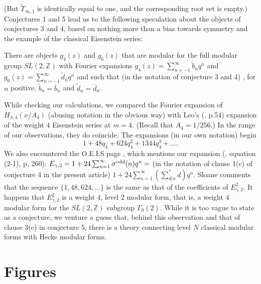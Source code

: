 \documentclass{article}
\begin{document}
\noindent
(But
$\widetilde{T}_{\infty,1}$ 
is identically equal to one,
and the corresponding root set
is empty.)
\newline \newline \noindent
Conjectures 1 and 5 lead us to
the following speculation about the
objects of conjectures 3 and 4,
based on nothing more than a bias
towards symmetry and the example
of the classical Eisenstein series:
\begin{conjecture}
There are objects $g_4(z)$ and $g_6(z)$ 
that are modular for
the full modular group $SL(2,\mathbb{Z})$
with Fourier expansions
$g_4(z) = \sum _{n=-1}^{\infty} \tilde{b}_n q^n$
and
$g_6(z) = \sum _{n=-1}^{\infty} \tilde{d}_n q^n$
and such that  (in the notation of
conjecture 3 and 4) , for $n$ positive,
$\tilde{b}_n = \overline{b}_n$ and
$\tilde{d}_n = \overline{d}_n$.
\end{conjecture}
\begin{remark}
While checking our calculations, we compared the 
Fourier expansion
of $H_{\lambda,4}(x/A_4)$ (abusing notation in the 
obvious way) with Leo's (\cite{leo2008fourier}, p.54)
expansion of the weight $4$ Eisenstein series at $m = 4$.
(Recall that $A_4 = 1/256.$)
In the range of our observations, they do coincide. 
%
%
The expansions (in our own notation) begin 
$$
1 + 48q_4 + 624 q_4^2 + 1344 q_4^3 + ....
$$
We also encountered the O.E.I.S  page
\cite{OEIS5},
which mentions our expansion
 (\cite{brent2001quadratic},
equation (2-1), p, 260):
$
E_{\gamma,2} = 1 + 24\sum_{n=1}^{\infty} \sigma^{\rm{odd}}(n) q^n =$
(in the notation of clause 1(c) of conjecture 4 in the present article)  
\newline
$1 + 24\sum_{n=1}^{\infty} (\sum^*_{d|n} d) q^n$. 
Sloane comments that the sequence
$\{1,48, 624, ... \}$ is the same as that of the
coefficients of $E_{\gamma,2}^2$. It happens that
$E_{\gamma,2}^2$ is a weight $4$, level $2$ modular form, that is,
a weight $4$ modular form for the $SL(2,\mathbb{Z})$ subgroup
$\Gamma_0(2)$. While it is too vague to state as a conjecture,
we venture a guess that, behind 
this observation and that of  
clause 3(c) in conjecture 5, 
there is a theory connecting
level $N$ classical modular forms with Hecke modular forms.
\end{remark}
\section{Figures}
\end{document}
